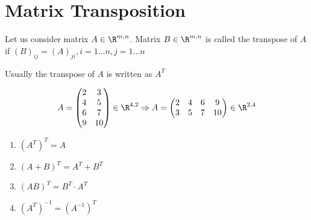 \section{Matrix Transposition}
\begin{definition}
Let us consider matrix $A\in\R^{m,n}$. Matrix $B\in\R^{m,n}$ is called the transpose of $A$ if $(B)_{ij} = (A)_{ji}, i=1\dots n, j=1\dots n$
\end{definition}
\begin{notation}
Usually the transpose of $A$ is written as $A^T$	
\end{notation}
\begin{example}
\[
A = \begin{pmatrix}
2 & 3\\
4 & 5\\
6 & 7\\
9 & 10
\end{pmatrix} \in\R^{4,2} \Rightarrow A = \begin{pmatrix}
2 & 4 & 6 & 9\\
3 & 5 & 7 & 10
\end{pmatrix} \in\R^{2,4}
\]	
\end{example}
\begin{properties}
\begin{enumerate}
\item $\left( A^T\right)^T = A$
\item $\left( A+B\right)^T = A^T + B^T$
\item $\left( AB\right)^T = B^T\cdot A^T$
\item $\left( A^T\right)^{-1} = \left( A^{-1}\right)^{T}$
\end{enumerate}
\end{properties}
